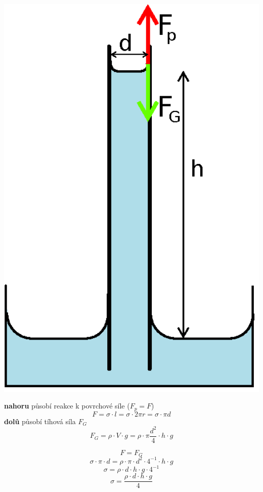 \documentclass[12pt, a4paper]{article}
\begin{document}
\begin{minipage}{0.4\textwidth}
    \includegraphics[width = 1\textwidth]{kapilara.eps}
\end{minipage}
\begin{minipage}{0.6\textwidth}
    \tab \textbf{nahoru }
    působí reakce k povrchové síle ($F_p = F$)
    $$F = \sigma \cdot l = \sigma \cdot 2\pi r = \sigma \cdot \pi d$$
    \tab \textbf{dolů }
    působí tíhová síla $F_G$
    $$F_G = \rho \cdot V \cdot g = \rho \cdot \pi \dfrac{d^2}{4} \cdot h \cdot g$$

    $$F = F_G$$
    $$\sigma \cdot \pi \cdot d = \rho \cdot \pi \cdot d^2 \cdot 4^{-1} \cdot h \cdot g$$
    $$\sigma = \rho \cdot d \cdot h \cdot g \cdot 4^{-1}$$
    $$\sigma = \dfrac{\rho \cdot d \cdot h \cdot g}{4}$$
\end{minipage} \par
\end{document}

